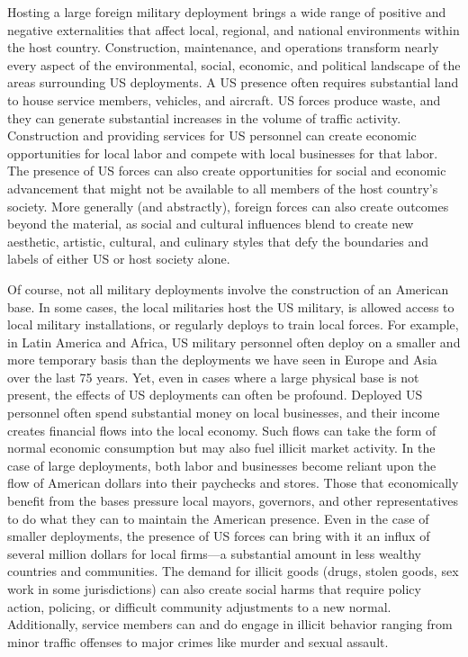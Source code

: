Hosting a large foreign military deployment brings a wide range of positive and negative externalities that affect local, regional, and national environments within the host country. Construction, maintenance, and operations transform nearly every aspect of the environmental, social, economic, and political landscape of the areas surrounding US deployments. A US presence often requires substantial land to house service members, vehicles, and aircraft. US forces produce waste, and they can generate substantial increases in the volume of traffic activity. Construction and providing services for US personnel can create economic opportunities for local labor and compete with local businesses for that labor. The presence of US forces can also create opportunities for social and economic advancement that might not be available to all members of the host country's society. More generally (and abstractly), foreign forces can also create outcomes beyond the material, as social and cultural influences blend to create new aesthetic, artistic, cultural, and culinary styles that defy the boundaries and labels of either US or host society alone.

Of course, not all military deployments involve the construction of an American base. In some cases, the local militaries host the US military, is allowed access to local military installations, or regularly deploys to train local forces. For example, in Latin America and Africa, US military personnel often deploy on a smaller and more temporary basis than the deployments we have seen in Europe and Asia over the last 75 years. Yet, even in cases where a large physical base is not present, the effects of US deployments can often be profound. Deployed US personnel often spend substantial money on local businesses, and their income creates financial flows into the local economy. Such flows can take the form of normal economic consumption but may also fuel illicit market activity. In the case of large deployments, both labor and businesses become reliant upon the flow of American dollars into their paychecks and stores. Those that economically benefit from the bases pressure local mayors, governors, and other representatives to do what they can to maintain the American presence. Even in the case of smaller deployments, the presence of US forces can bring with it an influx of several million dollars for local firms---a substantial amount in less wealthy countries and communities. The demand for illicit goods (drugs, stolen goods, sex work in some jurisdictions) can also create social harms that require policy action, policing, or difficult community adjustments to a new normal. Additionally, service members can and do engage in illicit behavior ranging from minor traffic offenses to major crimes like murder and sexual assault. 

